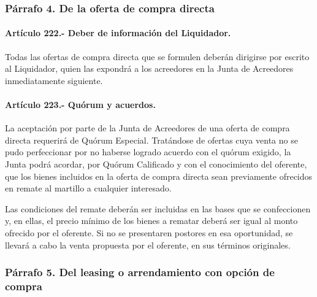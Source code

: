 \documentclass[
]{book}
\begin{document}
\hypertarget{puxe1rrafo-4.-de-la-oferta-de-compra-directa}{%
\subsubsection*{Párrafo 4. De la oferta de compra directa}\label{puxe1rrafo-4.-de-la-oferta-de-compra-directa}}

\hypertarget{artuxedculo-222.--deber-de-informaciuxf3n-del-liquidador.}{%
\paragraph*{Artículo 222.- Deber de información del Liquidador.}\label{artuxedculo-222.--deber-de-informaciuxf3n-del-liquidador.}}

Todas las ofertas de compra directa que se formulen deberán dirigirse por escrito al Liquidador, quien las expondrá a los acreedores en la Junta de Acreedores inmediatamente siguiente.

\hypertarget{artuxedculo-223.--quuxf3rum-y-acuerdos.}{%
\paragraph*{Artículo 223.- Quórum y acuerdos.}\label{artuxedculo-223.--quuxf3rum-y-acuerdos.}}

La aceptación por parte de la Junta de Acreedores de una oferta de compra directa requerirá de Quórum Especial. Tratándose de ofertas cuya venta no se pudo perfeccionar por no haberse logrado acuerdo con el quórum exigido, la Junta podrá acordar, por Quórum Calificado y con el conocimiento del oferente, que los bienes incluidos en la oferta de compra directa sean previamente ofrecidos en remate al martillo a cualquier interesado.

Las condiciones del remate deberán ser incluidas en las bases que se confeccionen y, en ellas, el precio mínimo de los bienes a rematar deberá ser igual al monto ofrecido por el oferente. Si no se presentaren postores en esa oportunidad, se llevará a cabo la venta propuesta por el oferente, en sus términos originales.

\hypertarget{puxe1rrafo-5.-del-leasing-o-arrendamiento-con-opciuxf3n-de-compra}{%
\subsubsection*{Párrafo 5. Del leasing o arrendamiento con opción de compra}\label{puxe1rrafo-5.-del-leasing-o-arrendamiento-con-opciuxf3n-de-compra}}
\end{document}
